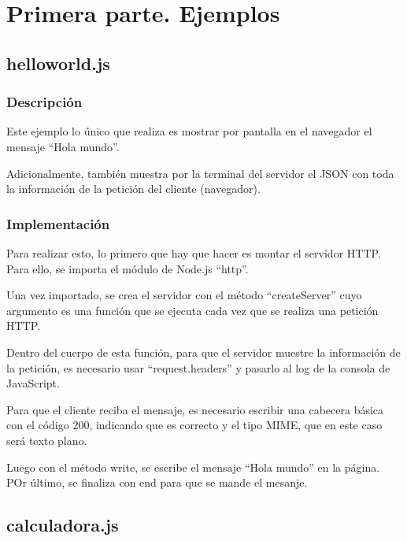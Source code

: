 \documentclass{article}
\begin{document}


\section{Primera parte. Ejemplos}
\subsection{helloworld.js}
\subsubsection{Descripción}
Este ejemplo lo único que realiza es mostrar por pantalla en el navegador el mensaje ``Hola mundo''.

Adicionalmente, también muestra por la terminal del servidor el JSON con toda la información de la petición del cliente (navegador).


\subsubsection{Implementación}
Para realizar esto, lo primero que hay que hacer es montar el servidor HTTP. Para ello, se importa el módulo de Node.js ``http''.

Una vez importado, se crea el servidor con el método ``createServer'' cuyo argumento es una función que se ejecuta cada vez que se realiza una petición HTTP.

Dentro del cuerpo de esta función, para que el servidor muestre la información de la petición, es necesario usar ``request.headers'' y pasarlo al log de la consola de JavaScript.

Para que el cliente reciba el mensaje, es necesario escribir una cabecera básica con el código 200, indicando que es correcto y el tipo MIME, que en este caso será texto plano.

Luego con el método write, se escribe el mensaje ``Hola mundo'' en la página. POr último, se finaliza con end para que se mande el mesanje. %


\subsection{calculadora.js}
\end{document}

